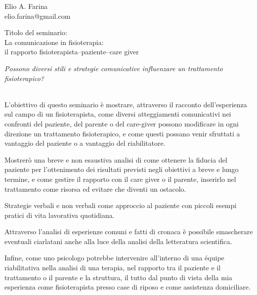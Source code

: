 \documentclass{article}
\begin{document}
\pagestyle{empty}

\null\hfill\begin{minipage}{0.4\linewidth}\raggedleft
{}\\
\fontsize{10pt}{12pt}\selectfont
elio.farina@gmail.com
\egroup
\end{minipage}
\large

\vspace{28pt}
Titolo del seminario:\\[7pt]
{\LARGE La comunicazione in fisioterapia:\\ il rapporto fisioterapista--paziente--care giver}

\vspace{28pt}
\begin{adjustwidth}{42pt}{0pt}
\begin{center}
\textit{Possono diversi stili e strategie comunicative influenzare un trattamento fisioterapico?}\\[7pt]
{\huge \adfhangingflatleafleft}\\[7pt]
\end{center}

L'obiettivo di questo seminario è mostrare, attraverso il racconto dell'esperienza sul campo di un fisioterapista, come diversi atteggiamenti comunicativi nei confronti del paziente, del parente o del care-giver possono modificare in ogni direzione un trattamento fisioterapico, e come questi possano venir sfruttati a vantaggio del paziente o a vantaggio del riabilitatore.

Mostrerò una breve e non esaustiva analisi di come ottenere la fiducia del paziente per l'ottenimento dei risultati previsti negli obiettivi a breve e lungo termine, e come gestire il rapporto con il care giver o il parente, inserirlo nel trattamento come risorsa ed evitare che diventi un ostacolo.

Strategie verbali e non verbali come approccio al paziente con piccoli esempi pratici di vita lavorativa quotidiana.

Attraverso l'analisi di esperienze comuni e fatti di cronaca è possibile smascherare eventuali ciarlatani anche alla luce della analisi della letteratura scientifica.

Infine, come uno psicologo potrebbe intervenire all'interno di una équipe riabilitativa nella analisi di una terapia, nel rapporto tra il paziente e il trattamento o il parente e la struttura, il tutto dal punto di vista della mia esperienza come fisioterapista presso case di riposo e come assistenza domiciliare.
\end{adjustwidth}
\end{document}
